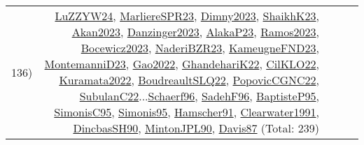 {\begin{longtable}{p{3cm}r>{\raggedright\arraybackslash}p{6cm}>{\raggedright\arraybackslash}p{6cm}>{\raggedright\arraybackslash}p{8cm}}
136) & \hyperref[detail:LuZZYW24]{LuZZYW24}, \hyperref[detail:MarliereSPR23]{MarliereSPR23}, \hyperref[detail:Dimny2023]{Dimny2023}, \hyperref[detail:ShaikhK23]{ShaikhK23}, \hyperref[detail:Akan2023]{Akan2023}, \hyperref[detail:Danzinger2023]{Danzinger2023}, \hyperref[detail:AlakaP23]{AlakaP23}, \hyperref[detail:Ramos2023]{Ramos2023}, \hyperref[detail:Bocewicz2023]{Bocewicz2023}, \hyperref[detail:NaderiBZR23]{NaderiBZR23}, \hyperref[detail:KameugneFND23]{KameugneFND23}, \hyperref[detail:MontemanniD23]{MontemanniD23}, \hyperref[detail:Gao2022]{Gao2022}, \hyperref[detail:GhandehariK22]{GhandehariK22}, \hyperref[detail:CilKLO22]{CilKLO22}, \hyperref[detail:Kuramata2022]{Kuramata2022}, \hyperref[detail:BoudreaultSLQ22]{BoudreaultSLQ22}, \hyperref[detail:PopovicCGNC22]{PopovicCGNC22}, \hyperref[detail:SubulanC22]{SubulanC22}...\hyperref[detail:Schaerf96]{Schaerf96}, \hyperref[detail:SadehF96]{SadehF96}, \hyperref[detail:BaptisteP95]{BaptisteP95}, \hyperref[detail:SimonisC95]{SimonisC95}, \hyperref[detail:Simonis95]{Simonis95}, \hyperref[detail:Hamscher91]{Hamscher91}, \hyperref[detail:Clearwater1991]{Clearwater1991}, \hyperref[detail:DincbasSH90]{DincbasSH90}, \hyperref[detail:MintonJPL90]{MintonJPL90}, \hyperref[detail:Davis87]{Davis87} (Total: 239)\\

\end{longtable}}
